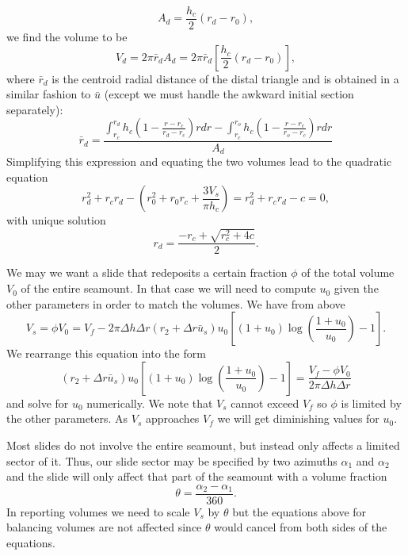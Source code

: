 \documentclass[12pt,letterpaper,margin=0.5in]{report}
\begin{document}
\begin{equation}
A_d = \frac{h_c}{2} (r_d - r_0),
\end{equation}
we find the volume to be
\begin{equation}
V_d = 2 \pi \bar{r}_d A_d = 2 \pi \bar{r}_d \left [ \frac{h_c}{2} (r_d - r_0) \right ],
\end{equation}
where $\bar{r}_d$ is the centroid radial distance of the distal triangle and is obtained in a similar fashion to $\bar{u}$ (except
we must handle the awkward initial section separately):
\begin{equation}
\bar{r}_d = \frac{\int_{r_c}^{r_d}h_c \left (1 - \frac{r - r_c}{r_d - r_c} \right )rdr - \int_{r_c}^{r_o}h_c \left (1 - \frac{r - r_c}{r_o- r_c} \right )rdr}{A_d}
\end{equation}
Simplifying this expression and equating the two volumes lead to the quadratic equation
\begin{equation}
r_d^2 + r_c r_d - \left (r_0^2 + r_0 r_c + \frac{3 V_s}{\pi h_c}\right ) = r_d^2 + r_c r_d - c = 0,
\end{equation}
with unique solution
\begin{equation}
r_d = \frac{-r_c + \sqrt{r_c^2 + 4c}}{2}.
\end{equation}

We may we want a slide that redeposits a certain fraction $\phi$ of the total volume $V_0$ of the entire seamount. In that
case we will need to compute $u_0$ given the other parameters in order to match the volumes.  We have from above
\begin{equation}
V_s = \phi V_0 = V_f - 2 \pi \Delta h \Delta r \left ( r_2 + \Delta r\bar{u}_s \right ) u_0 \left [ (1 + u_0) \log \left (\frac{1 + u_0}{u_0} \right ) - 1 \right ].
\end{equation}
We rearrange this equation into the form
\begin{equation}
\left ( r_2 + \Delta r \bar{u}_s \right ) u_0 \left [ (1 + u_0) \log \left (\frac{1 + u_0}{u_0} \right ) - 1 \right ] = \frac{V_f - \phi V_0}{2 \pi \Delta h \Delta r}
\end{equation}
and solve for $u_0$ numerically.  We note that $V_s$ cannot exceed $V_f$ so $\phi$ is limited by the other parameters.  As
$V_s$ approaches $V_f$ we will get diminishing values for $u_0$.

Most slides do not involve the entire seamount, but instead only affects a limited sector of it.  Thus, our slide sector may be specified by two
azimuths $\alpha_1$ and $\alpha_2$ and the slide will only affect that part of the seamount with a volume fraction
\begin{equation}
\theta = \frac{\alpha_2 - \alpha_1}{360}.
\end{equation}
In reporting volumes we need to scale $V_s$ by $\theta$ but the equations above for balancing volumes are not affected since $\theta$ would cancel from both sides of the equations.
\end{document}
